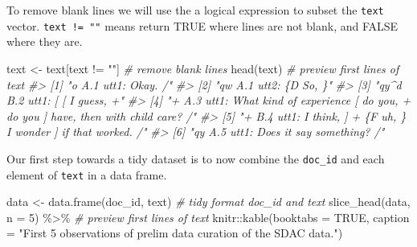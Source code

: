 \documentclass[
]{article}
\newenvironment{Shaded}{\begin{snugshade}}{\end{snugshade}}
\newcommand{\AttributeTok}[1]{\textcolor[rgb]{0.77,0.63,0.00}{#1}}
\newcommand{\CommentTok}[1]{\textcolor[rgb]{0.56,0.35,0.01}{\textit{#1}}}
\newcommand{\ConstantTok}[1]{\textcolor[rgb]{0.00,0.00,0.00}{#1}}
\newcommand{\DecValTok}[1]{\textcolor[rgb]{0.00,0.00,0.81}{#1}}
\newcommand{\FunctionTok}[1]{\textcolor[rgb]{0.00,0.00,0.00}{#1}}
\newcommand{\NormalTok}[1]{#1}
\newcommand{\OtherTok}[1]{\textcolor[rgb]{0.56,0.35,0.01}{#1}}
\newcommand{\SpecialCharTok}[1]{\textcolor[rgb]{0.00,0.00,0.00}{#1}}
\newcommand{\StringTok}[1]{\textcolor[rgb]{0.31,0.60,0.02}{#1}}
\begin{document}
To remove blank lines we will use the a logical expression to subset the \texttt{text} vector. \texttt{text\ !=\ ""} means return TRUE where lines are not blank, and FALSE where they are.

\begin{Shaded}
\begin{Highlighting}[]
\NormalTok{text }\OtherTok{\textless{}{-}}\NormalTok{ text[text }\SpecialCharTok{!=} \StringTok{""}\NormalTok{]  }\CommentTok{\# remove blank lines}
\FunctionTok{head}\NormalTok{(text)  }\CommentTok{\# preview first lines of \textasciigrave{}text\textasciigrave{}}
\CommentTok{\#\textgreater{} [1] "o          A.1 utt1: Okay.  /"                                                                  }
\CommentTok{\#\textgreater{} [2] "qw          A.1 utt2: \{D So, \}"                                                                 }
\CommentTok{\#\textgreater{} [3] "qy\^{}d          B.2 utt1: [ [ I guess, +"                                                         }
\CommentTok{\#\textgreater{} [4] "+          A.3 utt1: What kind of experience [ do you, + do you ] have, then with child care? /"}
\CommentTok{\#\textgreater{} [5] "+          B.4 utt1: I think, ] + \{F uh, \} I wonder ] if that worked. /"                        }
\CommentTok{\#\textgreater{} [6] "qy          A.5 utt1: Does it say something? /"}
\end{Highlighting}
\end{Shaded}

Our first step towards a tidy dataset is to now combine the \texttt{doc\_id} and each element of \texttt{text} in a data frame.

\begin{Shaded}
\begin{Highlighting}[]
\NormalTok{data }\OtherTok{\textless{}{-}} \FunctionTok{data.frame}\NormalTok{(doc\_id, text) }\CommentTok{\# tidy format \textasciigrave{}doc\_id\textasciigrave{} and \textasciigrave{}text\textasciigrave{}}
\FunctionTok{slice\_head}\NormalTok{(data, }\AttributeTok{n =} \DecValTok{5}\NormalTok{) }\SpecialCharTok{\%\textgreater{}\%} \CommentTok{\# preview first lines of \textasciigrave{}text\textasciigrave{}}
\NormalTok{  knitr}\SpecialCharTok{::}\FunctionTok{kable}\NormalTok{(}\AttributeTok{booktabs =} \ConstantTok{TRUE}\NormalTok{,}
               \AttributeTok{caption =} \StringTok{"First 5 observations of prelim data curation of the SDAC data."}\NormalTok{)}
\end{Highlighting}
\end{Shaded}
\end{document}

